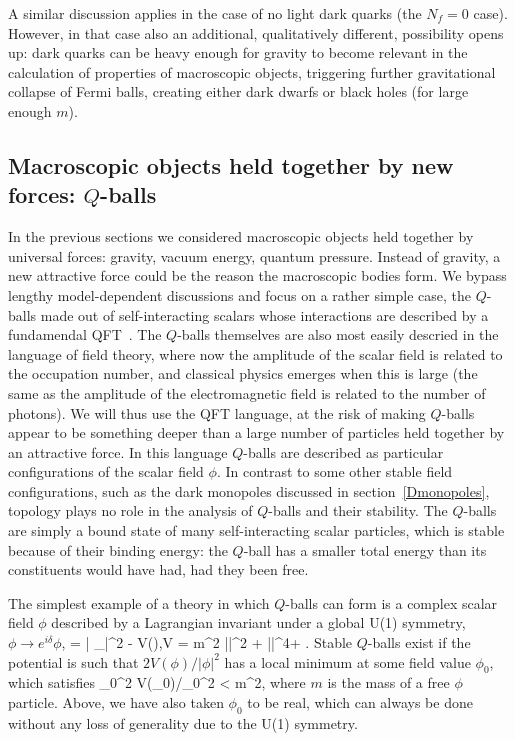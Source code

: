 \medskip

A similar discussion applies in the case of no light dark quarks (the $N_f=0$ case). However, in that case also 
an additional, qualitatively different, possibility opens up:
dark quarks can be heavy enough for gravity to 
become relevant in the calculation of properties of macroscopic objects, triggering further gravitational collapse 
of Fermi balls, creating either dark dwarfs or black holes  (for large enough $m$). 


\subsection{Macroscopic objects held together by new forces: $Q$-balls}
\label{sec:Q}
In the previous sections we considered macroscopic objects held together by universal forces: gravity, vacuum energy, quantum pressure.
Instead of gravity, a new attractive force could be the reason the macroscopic bodies form.
We bypass lengthy model-dependent discussions and focus on a rather simple case, the $Q$-balls made out of self-interacting scalars whose interactions are described by a fundamendal QFT~\cite{Qballs}. The $Q$-balls themselves are also most easily descried in the language of field theory, where now the amplitude of the scalar field is related to the occupation number, and classical physics emerges when this is large
(the same as the amplitude of the electromagnetic field is related to the number of photons). 
We will thus use the QFT language, at the risk of making $Q$-balls appear to be something deeper than a large number of particles held together by an attractive force. In this language $Q$-balls are described as particular configurations of the scalar  field $\phi$.
In contrast to some other stable field configurations, such as the dark monopoles discussed in section~\ref{Dmonopoles}, 
topology plays no role in the analysis of $Q$-balls and their stability.
The $Q$-balls are simply a bound state of many self-interacting scalar particles, which is
stable because of their binding energy: the $Q$-ball has a smaller total energy than its constituents would have had, had they been free.

\smallskip

The simplest example of a theory in which $Q$-balls can form is a complex scalar field $\phi$ described by a Lagrangian invariant under a global U(1) symmetry, $\phi \to e^{i\delta}\phi$, 
\beq 
\Lag = | \partial_\mu \phi|^2 - V(\phi),\qquad V = m^2 |\phi|^2 +  \lambda |\phi|^4+ \cdots. 
\eeq
Stable $Q$-balls exist if the potential is such that $2V(\phi)/|\phi|^2$ has a local minimum at some field value $\phi_0$, which satisfies
\beq
 \label{eq:QBomega0}
\omega_0^2  V(\phi_0)/\phi_0^2 < m^2,
\eeq
where $m$ is the mass of a free $\phi$ particle. Above, we have also taken $\phi_0$ to be real, which can always be done without any loss of generality due to the U(1) symmetry.


